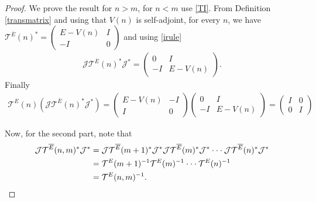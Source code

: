 \documentclass[12pt,oneside,onecolumn,open]{article}
\begin{document}
 \begin{proof} We prove the result for $n > m $, for $n < m$ use \eqref{TI}.  From Definition \ref{transmatrix} and using that $V(n)$ is self-adjoint, for every $n$, we have
    $
   \mathcal{T}^{\overline{E}}(n)^{*}= \begin{pmatrix}
 E-V(n) & I\\
 -I & 0
\end{pmatrix}
$  
and using \eqref{irule} 
 \begin{align}
  \mathcal{J} \mathcal{T}^{\overline{E}}(n)^{*}\mathcal{J}^{*}= \begin{pmatrix}
 0 & I\\
 -I &  E-V(n)
\end{pmatrix}.
\end{align}  
Finally 
\begin{align}
  \mathcal{T}^{E}(n)(\mathcal{J} \mathcal{T}^{\overline{E}}(n)^{*}\mathcal{J}^{*})= 
  \begin{pmatrix}
 E-V(n) & -I\\
 I & 0
\end{pmatrix}
  \begin{pmatrix}
 0 & I\\
 -I &  E-V(n)
\end{pmatrix}=
\begin{pmatrix}
 I & 0\\
 0 &  I
\end{pmatrix}
\end{align}  

Now, for the second part, note that 
\begin{align}
     \mathcal{J} \mathcal{T}^{\overline{E}}(n,m)^{*}\mathcal{J}^{*}&=\notag
     \mathcal{J} \mathcal{T}^{\overline{E}}(m+1)^{*}\mathcal{J}^{*} \mathcal{J} \mathcal{T}^{\overline{E}}(m)^{*}\mathcal{J}^{*}\cdot \cdot \cdot \mathcal{J}  \mathcal{T}^{\overline{E}}(n)^{*}\mathcal{J}^{*}\\&\notag
     =\mathcal{T}^{E}(m+1)^{-1} \mathcal{T}^{E}(m)^{-1}\cdot \cdot \cdot \mathcal{T}^{E}(n)^{-1}\\& \notag =\mathcal{T}^{E}(n,m)^{-1}.
\end{align}
 \end{proof}
\end{document}
